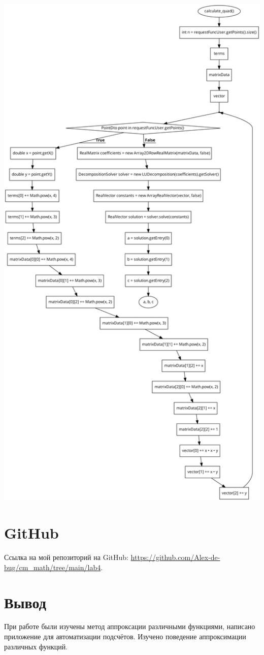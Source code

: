 \documentclass{article}
\begin{document}
\begin{center}
    \includegraphics[width=.6\textwidth]{quad_scheme.png}
\end{center}

\section{GitHub}
Ссылка на мой репозиторий на GitHub: \url{https://github.com/Alex-de-bug/cm_math/tree/main/lab4}.

\section{Вывод}
При работе были изучены метод аппроксации различными функциями, написано приложение для автоматизации подсчётов. Изучено поведение аппроксимации различных функций.
\end{document}
